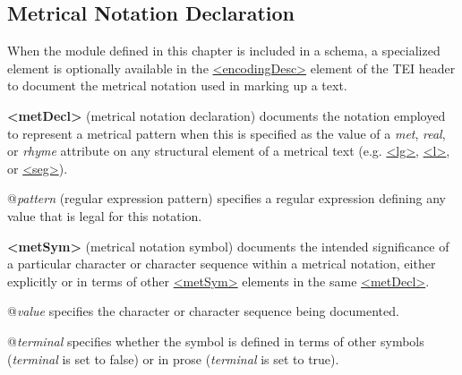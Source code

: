 \subsection[{Metrical Notation Declaration}]{Metrical Notation Declaration}\label{HDMN}\par
When the module defined in this chapter is included in a schema, a specialized element is optionally available in the \hyperref[TEI.encodingDesc]{<encodingDesc>} element of the TEI header to document the metrical notation used in marking up a text. 
\begin{sansreflist}
  
\item [\textbf{<metDecl>}] (metrical notation declaration) documents the notation employed to represent a metrical pattern when this is specified as the value of a {\itshape met}, {\itshape real}, or {\itshape rhyme} attribute on any structural element of a metrical text (e.g. \hyperref[TEI.lg]{<lg>}, \hyperref[TEI.l]{<l>}, or \hyperref[TEI.seg]{<seg>}).\hfil\\[-10pt]\begin{sansreflist}
    \item[@{\itshape pattern}]
  (regular expression pattern) specifies a regular expression defining any value that is legal for this notation.
\end{sansreflist}  
\item [\textbf{<metSym>}] (metrical notation symbol) documents the intended significance of a particular character or character sequence within a metrical notation, either explicitly or in terms of other \hyperref[TEI.metSym]{<metSym>} elements in the same \hyperref[TEI.metDecl]{<metDecl>}.\hfil\\[-10pt]\begin{sansreflist}
    \item[@{\itshape value}]
  specifies the character or character sequence being documented.
    \item[@{\itshape terminal}]
  specifies whether the symbol is defined in terms of other symbols ({\itshape terminal} is set to false) or in prose ({\itshape terminal} is set to true).
\end{sansreflist}  
\end{sansreflist}
\par
